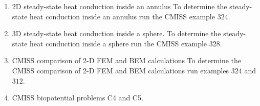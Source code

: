 \begin{enumerate}
  \item  2D steady-state heat conduction inside an annulus
    To determine the steady-state heat conduction inside an annulus run the
    CMISS example $324$.
    \label{xmp:2Dsshc} 

  \item  3D steady-state heat conduction inside a sphere. To determine the
    steady-state heat conduction inside a sphere run the
    CMISS example $328$.

  \item  CMISS comparison of 2-D FEM and BEM calculations
    To determine the CMISS comparison of 2-D FEM and BEM calculations run
    examples $324$ and $312$.
    \label{xmp:CMISScomp}

  \item  CMISS biopotential problems C4 and C5.
    \label{xmp:CMISScomp2}

\end{enumerate}

